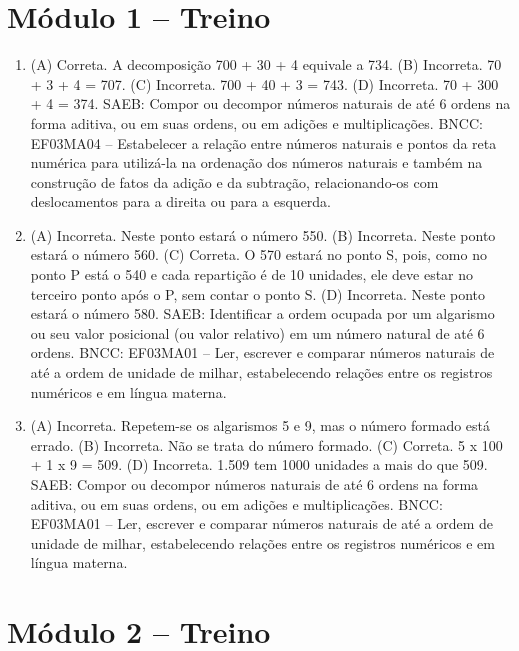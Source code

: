 \pagebreak
\pagestyle{plain}
\footnotesize

\pagecolor{gray!40}

\section*{Módulo 1 -- Treino}

\begin{enumerate}
\item
(A) Correta. A decomposição 700 + 30 + 4 equivale a 734.
(B) Incorreta. 70 + 3 + 4 = 707.
(C) Incorreta. 700 + 40 + 3 = 743.
(D) Incorreta. 70 + 300 + 4 = 374.
SAEB: Compor ou decompor números naturais de até 6 ordens na forma aditiva, ou em suas ordens, ou em adições e multiplicações.
BNCC: EF03MA04 -- Estabelecer a relação entre números naturais e pontos da reta numérica para
utilizá-la na ordenação dos números naturais e também na construção de fatos da adição e da
subtração, relacionando-os com deslocamentos para a direita ou para a esquerda.

\item
(A) Incorreta. Neste ponto estará o número 550.
(B) Incorreta. Neste ponto estará o número 560.
(C) Correta. O 570 estará no ponto S, pois, como no ponto P está o 540 e cada
repartição é de 10 unidades, ele deve estar no terceiro ponto após o P,
sem contar o ponto S.
(D) Incorreta. Neste ponto estará o número 580.
SAEB: Identificar a ordem ocupada por um algarismo ou seu valor posicional (ou valor relativo) em um número natural de até 6 ordens.
BNCC: EF03MA01 -- Ler, escrever e comparar números naturais de até a ordem de unidade de milhar, estabelecendo relações entre os registros numéricos e em língua materna.

\item
(A) Incorreta. Repetem-se os algarismos 5 e 9, mas o número formado está errado.
(B) Incorreta. Não se trata do número formado.
(C) Correta. 5 x 100 + 1 x 9 = 509.
(D) Incorreta. 1.509 tem 1000 unidades a mais do que 509.
SAEB: Compor ou decompor números naturais de até 6 ordens na forma aditiva, ou em suas ordens, ou em adições e multiplicações.
BNCC: EF03MA01 -- Ler, escrever e comparar números naturais de até a ordem de unidade de milhar, estabelecendo relações entre os registros numéricos e em língua materna.
\end{enumerate}

\section*{Módulo 2 -- Treino}

